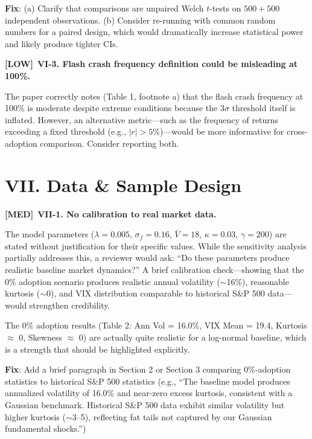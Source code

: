 \documentclass[12pt,a4paper]{article}
\newcommand{\MED}{\textbf{\textcolor{warncolor}{[MED]}}}
\newcommand{\LOW}{\textbf{\textcolor{okgreen}{[LOW]}}}
\begin{document}
\textbf{Fix}: (a) Clarify that comparisons are unpaired Welch $t$-tests on $500 + 500$ independent observations. (b) Consider re-running with common random numbers for a paired design, which would dramatically increase statistical power and likely produce tighter CIs.

\medskip

\LOW\ \textbf{VI-3. Flash crash frequency definition could be misleading at 100\%.}

The paper correctly notes (Table 1, footnote a) that the flash crash frequency at 100\% is moderate despite extreme conditions because the $3\sigma$ threshold itself is inflated. However, an alternative metric---such as the frequency of returns exceeding a fixed threshold (e.g., $|r| > 5\%$)---would be more informative for cross-adoption comparison. Consider reporting both.


\section*{VII. Data \& Sample Design}

\MED\ \textbf{VII-1. No calibration to real market data.}

The model parameters ($\lambda = 0.005$, $\sigma_f = 0.16$, $\bar{V} = 18$, $\kappa = 0.03$, $\gamma = 200$) are stated without justification for their specific values. While the sensitivity analysis partially addresses this, a reviewer would ask: ``Do these parameters produce realistic baseline market dynamics?'' A brief calibration check---showing that the 0\% adoption scenario produces realistic annual volatility ($\sim$16\%), reasonable kurtosis ($\sim$0), and VIX distribution comparable to historical S\&P 500 data---would strengthen credibility.

The 0\% adoption results (Table 2: Ann Vol = 16.0\%, VIX Mean = 19.4, Kurtosis $\approx$ 0, Skewness $\approx$ 0) are actually quite realistic for a log-normal baseline, which is a strength that should be highlighted explicitly.

\textbf{Fix}: Add a brief paragraph in Section 2 or Section 3 comparing 0\%-adoption statistics to historical S\&P 500 statistics (e.g., ``The baseline model produces annualized volatility of 16.0\% and near-zero excess kurtosis, consistent with a Gaussian benchmark. Historical S\&P 500 data exhibit similar volatility but higher kurtosis ($\sim$3--5), reflecting fat tails not captured by our Gaussian fundamental shocks.'')
\end{document}
